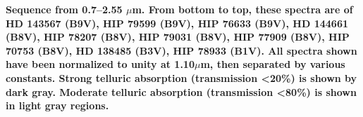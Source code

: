 {\bf Sequence from 0.7–2.55 $\mu$m. From bottom to top, these spectra are of HD 143567 (B9V), HIP 79599 (B9V), HIP 76633 (B9V), HD 144661 (B8V), HIP 78207 (B8V), HIP 79031 (B8V), HIP 77909 (B8V), HIP 70753 (B8V), HD 138485 (B3V), HIP 78933 (B1V).
All spectra shown have been normalized to unity at 1.10$\mu$m, then separated by various constants.  Strong telluric absorption (transmission <20\%) is shown by dark gray.  Moderate telluric absorption (transmission <80\%) is shown in light gray regions.\label{fig:stack-plot-b}}
